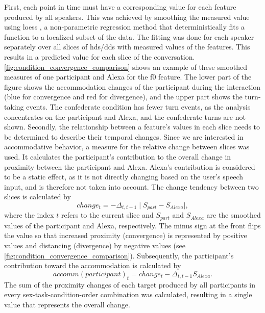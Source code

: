 First, each point in time must have a corresponding value for each feature produced by all speakers.
This was achieved by smoothing the measured value using \ac{loess} \citep{Cleveland1988locally}, a non-parametric regression method that deterministically fits a function to a localized subset of the data.
The fitting was done for each speaker separately over all slices of \ac{hds}/\ac{dds} with measured values of the features.
This results in a predicted value for each slice of the conversation.
\cref{fig:condition_convergence_comparison} shows an example of these smoothed measures of one participant and Alexa for the \ac{f0} feature.
The lower part of the figure shows the accommodation changes of the participant during the interaction (blue for convergence and red for divergence), and the upper part shows the turn-taking events.
The confederate condition has fewer turn events, as the analysis concentrates on the participant and Alexa, and the confederate turns are not shown.
Secondly, the relationship between a feature's values in each slice needs to be determined to describe their temporal changes.
Since we are interested in accommodative behavior, a measure for the relative change between slices was used.
It calculates the participant's contribution to the overall change in proximity between the participant and Alexa.
Alexa's contribution is considered to be a static effect, as it is not directly changing based on the user's speech input, and is therefore not taken into account.
The change tendency between two slices is calculated by
%
\begin{equation}
	\label{eq:change}
	change_t = -\Delta_{t, t-1} \mid S_{part} - S_{Alexa} \mid,
\end{equation}
\noindent
%
where the index $t$ refers to the current slice and $S_{part}$ and $S_{Alexa}$ are the smoothed values of the participant and Alexa, respectively.
The minus sign at the front flips the value so that increased proximity (convergence) is represented by positive values and distancing (divergence) by negative values (see \cref{fig:condition_convergence_comparison}).
Subsequently, the participant's contribution toward the accommodation is calculated by
%
\begin{equation}
	\label{eq:accommodation}
	accomm(participant)_t = change_t - \Delta_{t, t-1} S_{Alexa}.
\end{equation}
\noindent
%
The sum of the proximity changes of each target produced by all participants in every sex-task-condition-order combination was calculated, resulting in a single value that represents the overall change.
